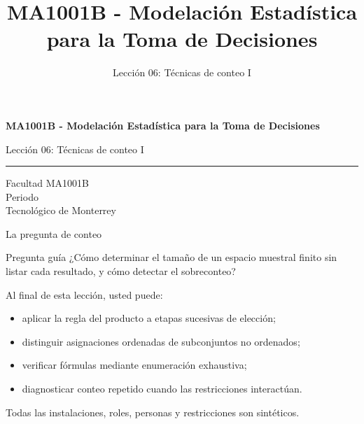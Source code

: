 \documentclass[aspectratio=169,10pt,spanish]{beamer}
\title{MA1001B - Modelación Estadística para la Toma de Decisiones}
\subtitle{Lección 06: Técnicas de conteo I}
\author{}
\institute{Tecnol\'ogico de Monterrey}
\date{}
\begin{document}
\begin{frame}[plain]
  \vspace{1.2cm}
  {\Large\bfseries MA1001B - Modelación Estadística para la Toma de Decisiones\par}
  \vspace{0.7cm}
  {\large Lección 06: Técnicas de conteo I\par}
  \vspace{0.7cm}
  {\color{TecRojo}\rule{\textwidth}{1.2pt}}
  \vspace{0.8cm}

  Facultad MA1001B\\[0.3cm]
  Periodo\\[0.3cm]
  Tecnol\'ogico de Monterrey
\end{frame}

\begin{frame}{La pregunta de conteo}
  \begin{alertblock}{Pregunta guía}
    ¿Cómo determinar el tamaño de un espacio muestral finito sin listar cada
    resultado, y cómo detectar el sobreconteo?
  \end{alertblock}

  \vspace{0.5em}
  Al final de esta lección, usted puede:
  \begin{itemize}
    \item aplicar la regla del producto a etapas sucesivas de elección;
    \item distinguir asignaciones ordenadas de subconjuntos no ordenados;
    \item verificar fórmulas mediante enumeración exhaustiva;
    \item diagnosticar conteo repetido cuando las restricciones interactúan.
  \end{itemize}

  \vfill
  \scriptsize Todas las instalaciones, roles, personas y restricciones son sintéticos.
\end{frame}
\end{document}
